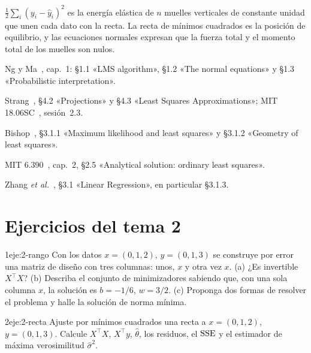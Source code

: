 \begin{observacion}[Física]
$\frac12\sum_i(y_i-\hat y_i)^{2}$ es la energía elástica de $n$ muelles verticales de constante unidad que unen cada dato con la recta. La recta de mínimos cuadrados es la posición de equilibrio, y las ecuaciones normales expresan que la fuerza total y el momento total de los muelles son nulos.
\end{observacion}

\begin{lecturas}
\item Ng y Ma~\cite{cs229}, cap.~1: §1.1 «LMS algorithm», §1.2 «The normal equations» y §1.3 «Probabilistic interpretation».
\item Strang~\cite{strang}, §4.2 «Projections» y §4.3 «Least Squares Approximations»; MIT 18.06SC~\cite{mit1806}, sesión~2.3.
\item Bishop~\cite{bishop}, §3.1.1 «Maximum likelihood and least squares» y §3.1.2 «Geometry of least squares».
\item MIT 6.390~\cite{mit6390}, cap.~2, §2.5 «Analytical solution: ordinary least squares».
\item Zhang \emph{et al.}~\cite{d2l}, §3.1 «Linear Regression», en particular §3.1.3.
\end{lecturas}

\section*{Ejercicios del tema 2}

\begin{ejercicio}{1}{eje:2-rango}
Con los datos $x=(0,1,2)$, $y=(0,1,3)$ se construye por error una matriz de diseño con tres columnas: unos, $x$ y otra vez $x$. (a) ¿Es invertible $X^{\top}X$? (b) Describa el conjunto de minimizadores sabiendo que, con una sola columna $x$, la solución es $b=-1/6$, $w=3/2$. (c) Proponga dos formas de resolver el problema y halle la solución de norma mínima.
\end{ejercicio}

\begin{ejercicio}{2}{eje:2-recta}
Ajuste por mínimos cuadrados una recta a $x=(0,1,2)$, $y=(0,1,3)$. Calcule $X^{\top}X$, $X^{\top}y$, $\hat\theta$, los residuos, el $\operatorname{SSE}$ y el estimador de máxima verosimilitud $\hat\sigma^{2}$.
\end{ejercicio}

